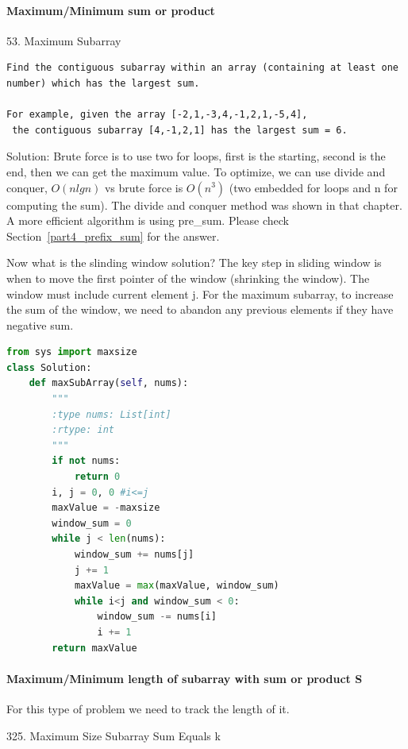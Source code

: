 \documentclass[../specific-algorithms.tex]{subfiles}
\begin{document}
\paragraph{Maximum/Minimum sum or product}

53. Maximum Subarray

\begin{lstlisting}
Find the contiguous subarray within an array (containing at least one number) which has the largest sum.

For example, given the array [-2,1,-3,4,-1,2,1,-5,4],
 the contiguous subarray [4,-1,2,1] has the largest sum = 6.
\end{lstlisting}
Solution: Brute force is to use two for loops, first is the starting, second is the end, then we can get the maximum value. To optimize, we can use divide and conquer, $O(nlgn)$ vs brute force is $O(n^3)$ (two embedded for loops and n for computing the sum). The divide and conquer method was shown in that chapter. A more efficient algorithm is using pre\_sum. Please check Section~\ref{part4_prefix_sum} for the answer. 

Now what is the slinding window solution? The key step in sliding window is when to move the first pointer of the window (shrinking the window). The window must include current element j. For the maximum subarray, to increase the sum of the window, we need to abandon any previous elements if they have negative sum.
\begin{lstlisting}[language = Python]
from sys import maxsize
class Solution:
    def maxSubArray(self, nums):
        """
        :type nums: List[int]
        :rtype: int
        """
        if not nums:
            return 0
        i, j = 0, 0 #i<=j
        maxValue = -maxsize
        window_sum = 0
        while j < len(nums):
            window_sum += nums[j]
            j += 1
            maxValue = max(maxValue, window_sum)
            while i<j and window_sum < 0:
                window_sum -= nums[i]
                i += 1                           
        return maxValue
\end{lstlisting}

\paragraph{Maximum/Minimum length of subarray with sum or product S}
For this type of problem we need to track the length of it. 

325. Maximum Size Subarray Sum Equals k
\end{document}
